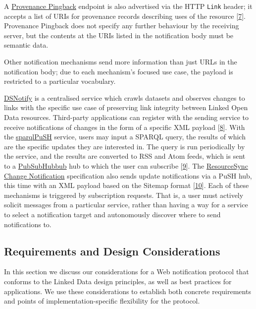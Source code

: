 \documentclass[]{article}
\begin{document}
A \href{http://www.w3.org/TR/prov-aq/\#provenance-pingback}{Provenance
Pingback} endpoint is also advertised via the HTTP \texttt{Link} header;
it accepts a list of URIs for provenance records describing uses of the
resource {[}\protect\hyperlink{ref-7}{7}{]}. Provenance Pingback does
not specify any further behaviour by the receiving server, but the
contents at the URIs listed in the notification body must be semantic
data.

Other notification mechanisms send more information than just URLs in
the notification body; due to each mechanism's focused use case, the
payload is restricted to a particular vocabulary.

\href{http://www.cibiv.at/~niko/dsnotify/}{DSNotify} is a centralised
service which crawls datasets and observes changes to links with the
specific use case of preserving link integrity between Linked Open Data
resources. Third-party applications can register with the sending
service to receive notifications of changes in the form of a specific
XML payload {[}\protect\hyperlink{ref-8}{8}{]}. With the
\href{https://www.w3.org/2001/sw/wiki/SparqlPuSH}{sparqlPuSH} service,
users may input a SPARQL query, the results of which are the specific
updates they are interested in. The query is run periodically by the
service, and the results are converted to RSS and Atom feeds, which is
sent to a
\href{http://pubsubhubbub.github.io/PubSubHubbub/pubsubhubbub-core-0.4.html}{PubSubHubbub}
hub to which the user can subscribe {[}\protect\hyperlink{ref-9}{9}{]}.
The
\href{http://www.openarchives.org/rs/notification/1.0/notification}{ResourceSync
Change Notification} specification also sends update notifications via a
PuSH hub, this time with an XML payload based on the Sitemap format
{[}\protect\hyperlink{ref-10}{10}{]}. Each of these mechanisms is
triggered by subscription requests. That is, a user must actively
solicit messages from a particular service, rather than having a way for
a service to select a notification target and autonomously discover
where to send notifications to.

\hypertarget{requirements-and-design-considerations}{}
\hypertarget{requirements-and-design-considerations}{\subsection{Requirements
and Design
Considerations}\label{requirements-and-design-considerations}}

In this section we discuss our considerations for a {Web notification
protocol that conforms to the Linked Data design principles}, as well as
{best practices for applications}. We use these considerations to
establish both concrete requirements and points of
implementation-specific flexibility for the protocol.
\end{document}
